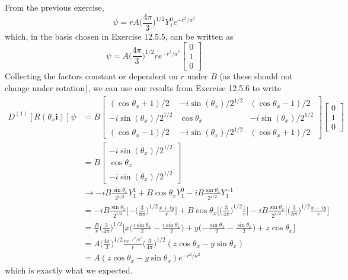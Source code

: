 \documentclass[../principles-of-quantum-mechanics.tex]{subfiles}
\begin{document}
\begin{questions}
		\begin{solution}
			From the previous exercise, 
			$$\psi = rA\Big(\frac{4\pi}{3}\Big)^{1/2}Y_1^0e^{-r^2/a^2}$$
			which, in the basis chosen in Exercise 12.5.5, can be written as
			$$\psi = A\Big(\frac{4\pi}{3}\Big)^{1/2}re^{-r^2/a^2}\begin{bmatrix}0 \\ 1 \\ 0\end{bmatrix}$$
			Collecting the factors constant or dependent on $r$ under $B$ (as these should not change under rotation), we can use our results from Exercise 12.5.6 to write
			\begin{align*}
				D^{(1)}[R(\theta_x\mathbf{i})]\psi &= B\begin{bmatrix}
					(\cos\theta_x + 1)/2 & -i\sin(\theta_x)/2^{1/2} & (\cos\theta_x - 1)/2 \\
					-i\sin(\theta_x)/2^{1/2} & \cos\theta_x & -i\sin(\theta_x)/2^{1/2} \\
					(\cos\theta_x - 1)/2 & -i\sin(\theta_x)/2^{1/2} & (\cos\theta_x+ 1)/2
				\end{bmatrix}\begin{bmatrix}0 \\ 1 \\0\end{bmatrix} \\
				&= B\begin{bmatrix}
					-i\sin(\theta_x)/2^{1/2} \\ \cos\theta_x \\ -i\sin(\theta_x)/2^{1/2}
				\end{bmatrix} \\
				&\to -iB\frac{\sin\theta_x}{2^{1/2}}Y_1^1 + B\cos\theta_x Y_1^0 - iB\frac{\sin\theta_x}{2^{1/2}}Y_1^{-1} \\
				&= -iB\frac{\sin\theta_x}{2^{1/2}}\Big[{-\Big(\frac{3}{8\pi}\Big)^{1/2}}\frac{x+ iy}{r}\Big] + B\cos\theta_x\Big[\Big(\frac{3}{4\pi}\Big)^{1/2}\frac{z}{r}\Big] - iB\frac{\sin\theta_x}{2^{1/2}}\Big[\Big(\frac{3}{8\pi}\Big)^{1/2}\frac{x- iy}{r}\Big] \\
				&= \frac{B}{r}\Big(\frac{3}{4\pi}\Big)^{1/2}\Big[x\Big(\frac{i\sin\theta_x}{2} - \frac{i\sin\theta_x}{2}\Big) + y\Big({-\frac{\sin\theta_x}{2}} - \frac{\sin\theta_x}{2}\Big) + z\cos\theta_x\Big] \\
				&= A\Big(\frac{4\pi}{3}\Big)^{1/2}\frac{re^{-r^2/a^2}}{r}\Big(\frac{3}{4\pi}\Big)^{1/2}(z\cos\theta_x - y\sin\theta_x) \\
				&= A(z\cos\theta_x - y\sin\theta_x)e^{-r^2/a^2}
			\end{align*}
			which is exactly what we expected.
		\end{solution}
	

\end{questions}
\end{document}

